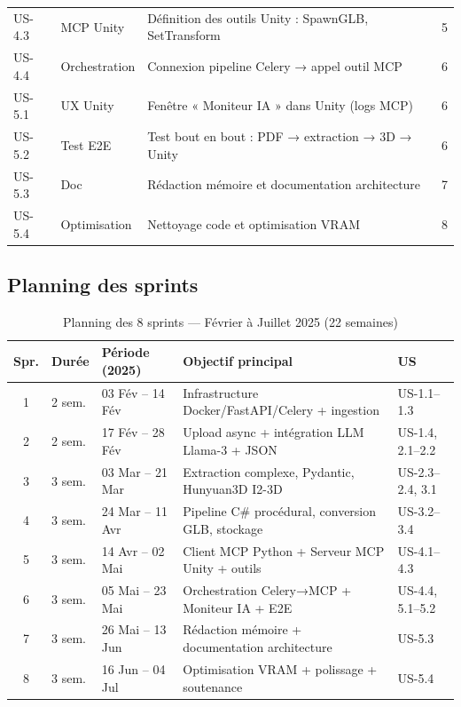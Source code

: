 \documentclass[12pt,a4paper,oneside]{report}
\begin{document}
\begin{table}[H]
\begin{tabularx}{\linewidth}{@{}llXl@{}}
US-4.3 & MCP Unity      & Définition des outils Unity : SpawnGLB, SetTransform & 5 \\
US-4.4 & Orchestration  & Connexion pipeline Celery → appel outil MCP & 6 \\
\midrule
\rowcolor{gray!8}
US-5.1 & UX Unity       & Fenêtre « Moniteur IA » dans Unity (logs MCP) & 6 \\
US-5.2 & Test E2E       & Test bout en bout : PDF → extraction → 3D → Unity & 6 \\
US-5.3 & Doc            & Rédaction mémoire et documentation architecture & 7 \\
US-5.4 & Optimisation   & Nettoyage code et optimisation VRAM & 8 \\
\bottomrule
\end{tabularx}
\end{table}

\subsection{Planning des sprints}

\begin{table}[H]
\centering
\caption{Planning des 8 sprints --- Février à Juillet 2025 (22 semaines)}
\label{tab:sprints}
\begin{tabularx}{\linewidth}{@{}cllXl@{}}
\toprule
\textbf{Spr.} & \textbf{Durée} & \textbf{Période (2025)}
              & \textbf{Objectif principal} & \textbf{US} \\
\midrule
1 & 2 sem. & 03 Fév -- 14 Fév & Infrastructure Docker/FastAPI/Celery + ingestion & US-1.1--1.3 \\
2 & 2 sem. & 17 Fév -- 28 Fév & Upload async + intégration LLM Llama-3 + JSON & US-1.4, 2.1--2.2 \\
3 & 3 sem. & 03 Mar -- 21 Mar & Extraction complexe, Pydantic, Hunyuan3D I2-3D & US-2.3--2.4, 3.1 \\
4 & 3 sem. & 24 Mar -- 11 Avr & Pipeline C\# procédural, conversion GLB, stockage & US-3.2--3.4 \\
5 & 3 sem. & 14 Avr -- 02 Mai & Client MCP Python + Serveur MCP Unity + outils & US-4.1--4.3 \\
6 & 3 sem. & 05 Mai -- 23 Mai & Orchestration Celery→MCP + Moniteur IA + E2E & US-4.4, 5.1--5.2 \\
7 & 3 sem. & 26 Mai -- 13 Jun & Rédaction mémoire + documentation architecture & US-5.3 \\
8 & 3 sem. & 16 Jun -- 04 Jul & Optimisation VRAM + polissage + soutenance & US-5.4 \\
\bottomrule
\end{tabularx}
\end{table}
\end{document}
